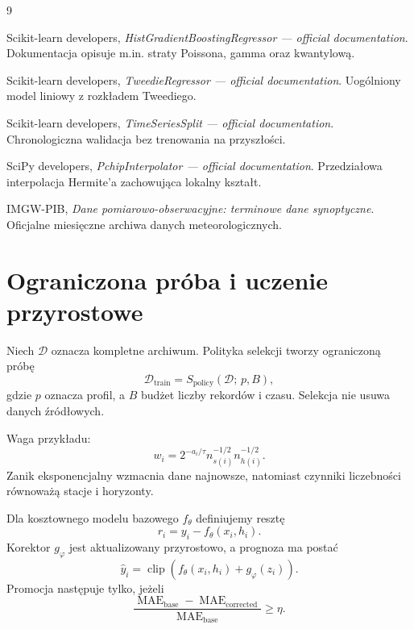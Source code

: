 \documentclass[11pt,a4paper,oneside]{article}
\begin{document}
\begin{thebibliography}{9}

Scikit-learn developers,
\emph{HistGradientBoostingRegressor --- official documentation}.
Dokumentacja opisuje m.in. straty Poissona, gamma oraz kwantylową.

Scikit-learn developers,
\emph{TweedieRegressor --- official documentation}.
Uogólniony model liniowy z rozkładem Tweediego.

Scikit-learn developers,
\emph{TimeSeriesSplit --- official documentation}.
Chronologiczna walidacja bez trenowania na przyszłości.

SciPy developers,
\emph{PchipInterpolator --- official documentation}.
Przedziałowa interpolacja Hermite'a zachowująca lokalny kształt.

IMGW-PIB,
\emph{Dane pomiarowo-obserwacyjne: terminowe dane synoptyczne}.
Oficjalne miesięczne archiwa danych meteorologicznych.

\end{thebibliography}



\section{Ograniczona próba i uczenie przyrostowe}

Niech $\mathcal D$ oznacza kompletne archiwum. Polityka selekcji tworzy
ograniczoną próbę
\begin{equation}
 \mathcal D_{\mathrm{train}}
 = S_{\mathrm{policy}}(\mathcal D;\,p,B),
\end{equation}
gdzie $p$ oznacza profil, a $B$ budżet liczby rekordów i czasu. Selekcja nie
usuwa danych źródłowych.

Waga przykładu:
\begin{equation}
 w_i = 2^{-a_i/\tau}
       n_{s(i)}^{-1/2}
       n_{h(i)}^{-1/2}.
\end{equation}
Zanik eksponencjalny wzmacnia dane najnowsze, natomiast czynniki liczebności
równoważą stacje i horyzonty.

Dla kosztownego modelu bazowego $f_\theta$ definiujemy resztę
\begin{equation}
 r_i=y_i-f_\theta(x_i,h_i).
\end{equation}
Korektor $g_\varphi$ jest aktualizowany przyrostowo, a prognoza ma postać
\begin{equation}
 \widehat y_i=
 \operatorname{clip}\!\left(
 f_\theta(x_i,h_i)+g_\varphi(z_i)
 \right).
\end{equation}
Promocja następuje tylko, jeżeli
\begin{equation}
 \frac{\operatorname{MAE}_{\mathrm{base}}-
       \operatorname{MAE}_{\mathrm{corrected}}}
      {\operatorname{MAE}_{\mathrm{base}}}
 \ge \eta.
\end{equation}
\end{document}

